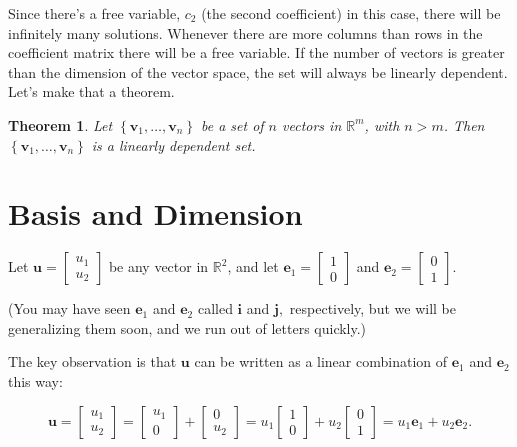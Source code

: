 \documentclass[
]{book}
\newtheorem{theorem}{Theorem}[chapter]
\theoremstyle{definition}
\theoremstyle{definition}
\theoremstyle{definition}
\theoremstyle{definition}
\theoremstyle{remark}
\begin{document}
Since there's a free variable, \(c_2\) (the second coefficient) in this case, there will be infinitely many solutions. Whenever there are more columns than rows in the coefficient matrix there will be a free variable.
If the number of vectors is greater than the dimension of the vector space, the set will always be linearly dependent. Let's make that a theorem.

\begin{theorembox}

\begin{theorem}
Let \(\left\{\mathbf{v}_1,\dots,\mathbf{v}_n\right\}\) be a set of \(n\) vectors in \(\mathbb{R}^m\), with \(n>m\). Then \(\left\{\mathbf{v}_1,\dots,\mathbf{v}_n\right\}\) is a linearly dependent set.
\end{theorem}

\end{theorembox}

\section{Basis and Dimension}\label{basis-and-dimension}

Let \(\mathbf{u}=\begin{bmatrix}u_1\\u_2\end{bmatrix}\) be any vector in \(\mathbb{R}^2\), and let \(\mathbf{e}_1=\begin{bmatrix}1\\0\end{bmatrix}\) and \(\mathbf{e}_2=\begin{bmatrix}0\\1\end{bmatrix}\).

(You may have seen \(\mathbf{e}_1\) and \(\mathbf{e}_2\) called \(\mathbf{i}\) and \(\mathbf{j},\) respectively, but we will be generalizing them soon, and we run out of letters quickly.)

The key observation is that \(\mathbf{u}\) can be written as a linear combination of \(\mathbf{e}_1\) and \(\mathbf{e}_2\) this way:

\[\mathbf{u}=\begin{bmatrix}u_1\\u_2\end{bmatrix}=\begin{bmatrix}u_1\\0\end{bmatrix}+\begin{bmatrix}0\\u_2\end{bmatrix}=u_1\begin{bmatrix}1\\0\end{bmatrix}+u_2\begin{bmatrix}0\\1\end{bmatrix}=u_1\mathbf{e}_1+u_2\mathbf{e}_2.\]
\end{document}
